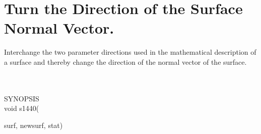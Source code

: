 \section{Turn the Direction of the Surface Normal Vector.}
\begin{minipg1}
  Interchange the two parameter directions used in the mathematical
  description of a surface and thereby change the direction of the
  normal vector of the surface.
\end{minipg1} \\ \\
SYNOPSIS\\
        \>void s1440(\begin{minipg3}
                                {\fov surf}, {\fov newsurf}, {\fov stat})
                \end{minipg3}\\[0.3ex]

